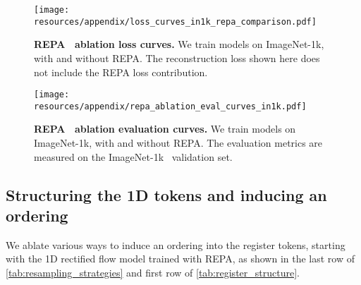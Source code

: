 \begin{figure}[h]
\centering
\texttt{[image: resources/appendix/loss\_curves\_in1k\_repa\_comparison.pdf]}
\caption{
\textbf{REPA~\cite{Yu2024REPA} ablation loss curves.}
We train \oursbase models on ImageNet-1k, with and without REPA. The reconstruction loss shown here does not include the REPA loss contribution. 
}
\label{fig:app_flextok_repa_train_curves}
\end{figure}

\begin{figure}[h]
\centering
\texttt{[image: resources/appendix/repa\_ablation\_eval\_curves\_in1k.pdf]}
\caption{
\textbf{REPA~\cite{Yu2024REPA} ablation evaluation curves.}
We train \oursbase models on ImageNet-1k, with and without REPA. The evaluation metrics are measured on the ImageNet-1k~\cite{Russakovsky2014ImageNet} validation set.
}
\label{fig:app_flextok_repa_eval_curves}
\end{figure}



\subsection{Structuring the 1D tokens and inducing an ordering}
\label{sec:app_1d_structure_ablation}
We ablate various ways to induce an ordering into the register tokens, starting with the 1D rectified flow model trained with REPA, as shown in the last row of \cref{tab:resampling_strategies} and first row of \cref{tab:register_structure}.

